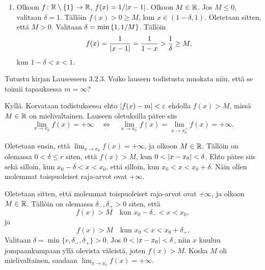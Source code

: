 \documentclass[11pt,a4paper]{amsart}
\begin{document}
\begin{solution}
\begin{enumerate}[label=(\alph*), nosep]
      Oletetaan, että on olemassa \(r > 0\) siten, että
      \((x_0, x_0 + r) \subset A\). Tällöin määritellään
      \(\lim_{x \to x_0^+} f(x) = -\infty\) jos ja vain jos jokaista
      \(m \in \RR\) kohti on olemassa sellainen \(0 < \delta \leq r\), että
      \(f(x) < m\) kaikilla \(x \in (x_0, x_0 + \delta)\).

    \item Olkoon \(f \colon \mathbb{R} \setminus \left\lbrace1\right\rbrace \to \mathbb{R}\), \(f(x) =
      1/\lvert x - 1\rvert\). Olkoon \(M \in \mathbb{R}\). Jos \(M \leq 0\), valitaan
      \(\delta = 1\). Tällöin \(f(x) > 0 \geq M\), kun \(x \in (1 -
      \delta, 1)\).
      Oletetaan sitten, että \(M > 0\). Valitaan \(\delta = \min\left\lbrace1, 1/M\right\rbrace\).
      Tällöin
      \[
        f(x) = \frac{1}{\lvert x - 1\rvert} = \frac{1}{1 - x} >
        \frac{1}{\delta} \geq M,
      \]
      kun \(1 - \delta < x < 1\).
  \end{enumerate}
\end{solution}

\begin{exercise}
  Tutustu kirjan Lauseeseen 3.2.3. Voiko lauseen todistusta muokata niin,
  että se toimii tapauksessa \(m = \infty\)?
\end{exercise}

\begin{solution}
  Kyllä. Korvataan todistuksessa ehto \(\lvert f(x) - m\rvert < \varepsilon\)
  ehdolla \(f(x) > M\), missä \(M \in \mathbb{R}\) on mielivaltainen.
  Lauseen oletuksilla pätee siis
  \[
    \lim_{x \to x_0} f(x) = +\infty
    \quad\Longleftrightarrow\quad
    \lim_{x \to x_0^-} f(x) = \lim_{x \to x_0^+} f(x) = +\infty.
  \]

  Oletetaan ensin, että \(\lim_{x \to x_0} f(x) = +\infty\), ja olkoon
  \(M \in \mathbb{R}\). Tällöin on olemassa \(0 < \delta \leq r\) siten, että
  \(f(x) > M\), kun \(0 < \lvert x - x_0\rvert < \delta\). Ehto pätee siis
  sekä silloin, kun \(x_0 - \delta < x < x_0\), että silloin, kun
  \(x_0 < x < x_0 + \delta\). Näin ollen molemmat toispuoleiset
  raja-arvot ovat \(+\infty\).

  Oletetaan sitten, että molemmat toispuoleiset raja-arvot ovat
  \(+\infty\), ja olkoon \(M \in \mathbb{R}\). Tällöin on olemassa
  \(\delta_-, \delta_+ > 0\) siten, että
  \[
    f(x) > M \quad\text{kun } x_0 - \delta_- < x < x_0,
  \]
  ja
  \[
    f(x) > M \quad\text{kun } x_0 < x < x_0 + \delta_+.
  \]
  Valitaan \(\delta = \min\{r, \delta_-, \delta_+\} > 0\).
  Jos \(0 < \lvert x - x_0\rvert < \delta\), niin \(x\) kuuluu jompaankumpaan
  yllä olevista väleistä, joten \(f(x) > M\). Koska \(M\) oli
  mielivaltainen, saadaan \(\lim_{x \to x_0} f(x) = +\infty\).
\end{solution}
\end{document}
